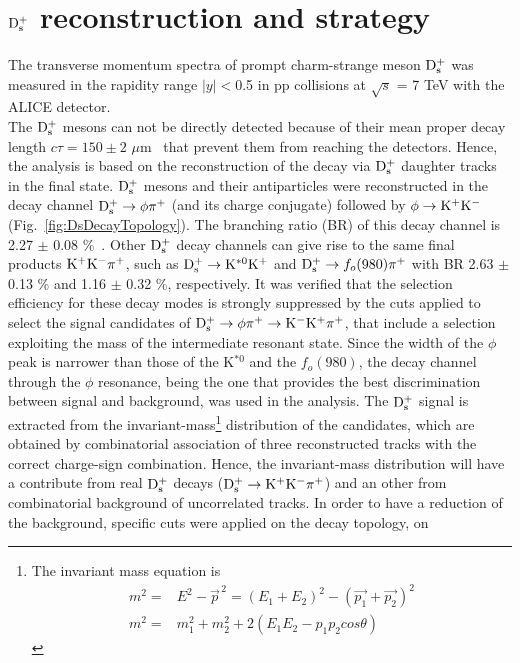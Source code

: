 \section{${\rm D_s^+}$ reconstruction and strategy}
The transverse momentum spectra of prompt charm-strange meson 
${\rm D_s^+}$ was measured in the rapidity range $|y| < $0.5 in pp collisions at 
$\sqrt{s}$ = 7 TeV with the ALICE detector.\\
The ${\rm D_s^+}$ mesons can not be directly detected because of 
their mean proper decay length $c\tau = 150\pm 2$ $ \mu$m~\cite{Olive:2016xmw} 
that prevent them from reaching the detectors. Hence, the analysis is 
based on the reconstruction of the decay via ${\rm D_s^+}$ daughter tracks in
the final state. ${\rm D_s^+}$ mesons and their antiparticles were 
 reconstructed in the decay channel ${\rm D_s^{+}\to \phi\pi^+}$ 
 (and its charge conjugate) followed by ${\phi \to {\rm K^+ K^-}}$ 
 (Fig.~\ref{fig:DsDecayTopology}). The branching ratio (BR) of this decay channel 
 is 2.27 $\pm$ 0.08 \%~\cite{Olive:2016xmw}.
Other ${\rm D_s^+}$ decay channels can give rise to the same final products
 ${\rm K^+ K^-}\pi^+$, such as ${\rm D_s^+}\rightarrow {\rm  K^{*0} K^+}$ and 
 ${\rm D_s^+}\rightarrow f_o(980) \pi^+$ with BR  2.63 $\pm$ 0.13 \% and 
 1.16 $\pm$ 0.32 \%, respectively. It was verified that the selection efficiency for 
 these decay modes is strongly suppressed by the cuts applied 
 to select the signal candidates of ${\rm D_s^{+}\to \phi\pi^+\to K^-K^+\pi^+}$, that include 
 a selection exploiting the mass of the intermediate resonant state. 
 Since the width of the $\phi$ peak is narrower than those of the 
 K$^{*0}$ and the $f_o(980)$, the decay channel through the 
 $\phi$ resonance, being the one that provides the best discrimination 
 between signal and background, was used in the analysis. 
 The ${\rm D_s^+}$ signal is extracted from 
 the invariant-mass\footnote{The invariant mass equation is \\ 
 \begin{align*} m^2 =& E^2 -\vec{p}^{\, 2} = (E_1 + E_2)^2 -(\vec{p_1} + \vec{p_2})^2 \\ m^2 =& m_1^2 +m_2^2 + 2(E_1E_2 -p_1p_2cos\theta) \end{align*}} 
 distribution of the candidates, which are obtained by 
 combinatorial association of three reconstructed tracks with the correct 
 charge-sign combination. Hence, 
 the invariant-mass distribution will have a contribute from real 
 ${\rm D_s^+}$ decays (${\rm D^{+}_\mathrm{s}\to K^+ K^-\pi^+}$) and an other 
 from combinatorial background of uncorrelated tracks. In order to have a reduction of the
  background, specific cuts were applied on the decay topology, on
